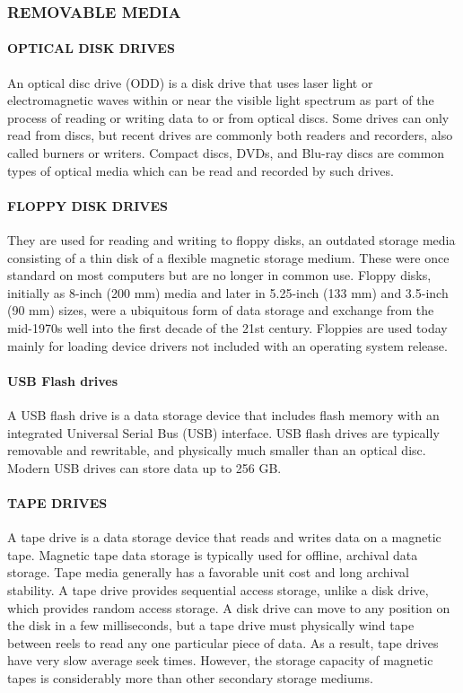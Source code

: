 \documentclass[a4paper,28pt]{report}
\begin{document}
\subsubsection*{REMOVABLE MEDIA}
	\paragraph{OPTICAL DISK DRIVES}
	 An optical disc drive (ODD) is a disk drive that uses laser light or electromagnetic
	waves within or near the visible light spectrum as part of the process of reading or writing data to or
	from optical discs. Some drives can only read from discs, but recent drives are commonly both readers
	and recorders, also called burners or writers. Compact discs, DVDs, and Blu-ray discs are common
	types of optical media which can be read and recorded by such drives.
	\paragraph{FLOPPY DISK DRIVES} 
	They are used for reading and writing to floppy disks, an outdated storage media
	consisting of a thin disk of a flexible magnetic storage medium. These were once standard on most
	computers but are no longer in common use. Floppy disks, initially as 8-inch (200 mm) media and later
	in 5.25-inch (133 mm) and 3.5-inch (90 mm) sizes, were a ubiquitous form of data storage and
	exchange from the mid-1970s well into the first decade of the 21st century. Floppies are used today
	mainly for loading device drivers not included with an operating system release.
	\paragraph{USB Flash drives}
	 A USB flash drive is a data storage device that includes flash memory with an
	integrated Universal Serial Bus (USB) interface. USB flash drives are typically removable and
	rewritable, and physically much smaller than an optical disc. Modern USB drives can store data up to
	256 GB.
	\paragraph{TAPE DRIVES}
	 A tape drive is a data storage device that reads and writes data on a magnetic
	tape. Magnetic tape data storage is typically used for offline, archival data storage. Tape media
	generally has a favorable unit cost and long archival stability. A tape drive provides sequential
	access storage, unlike a disk drive, which provides random access storage. A disk drive can move to
	any position on the disk in a few milliseconds, but a tape drive must physically wind tape between reels
	to read any one particular piece of data. As a result, tape drives have very slow average seek times.
	However, the storage capacity of magnetic tapes is considerably more than other secondary storage
	mediums.
\end{document}
